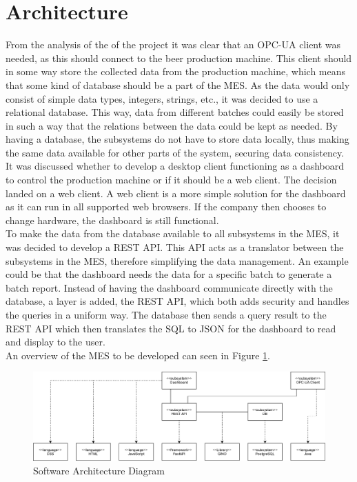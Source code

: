 \section{Architecture}
From the analysis of the of the project it was clear that an OPC-UA
client was needed, as this should connect to the beer production machine. This
client should in some way store the collected data from the production machine,
which means that some kind of database should be a part of the MES. As the data
would only consist of simple data types, integers, strings, etc., it was decided
to use a relational database. This way, data from different batches could easily
be stored in such a way that the relations between the data could be kept as
needed. By having a database, the subsystems do not have to store data
locally, thus making the same data available for other parts of the system,
securing data consistency. \\

It was discussed whether to develop a desktop client functioning as a dashboard
to control the production machine or if it should be a web client. The decision
landed on a web client. A web client is a more simple solution for the dashboard
as it can run in all supported web browsers. If the company then chooses to
change hardware, the dashboard is still functional. \\
 
To make the data from the database available to all subsystems in the MES, 
it was decided to develop a REST API. This API acts as a translator
between the subsystems in the MES, therefore simplifying the data management.
An example could be that the dashboard needs the data for a specific batch to
generate a batch report. Instead of having the dashboard communicate directly
with the database, a layer is added, the REST API, which both adds security and
handles the queries in a uniform way. The database then sends a query result to
the REST API which then translates the SQL to JSON for the dashboard to read
and display to the user. \\

An overview of the MES to be developed can seen in Figure
\ref{figure:architucture_diagram}.

\begin{figure}[ht]
	\centering 
	\includegraphics[scale=0.24]{images/diagrams/architecture_diagram.png}
	\caption{Software Architecture Diagram}
	\label{figure:architucture_diagram} 
\end{figure}
